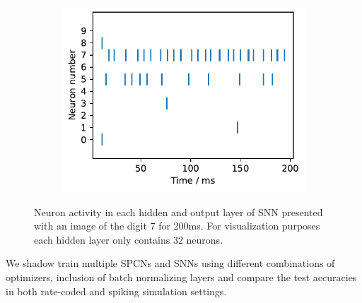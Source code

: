 \documentclass[a4paper,11pt]{article}
\begin{document}
\begin{figure}[ht]
\begin{subfigure}[t]{0.32\columnwidth}
    \includegraphics[width=\linewidth]{graphics/spikes_2.pdf}  
  \end{subfigure}
  \caption{Neuron activity in each hidden and output layer of SNN presented with an image of the digit 7 for 200ms. For visualization purposes each hidden layer only contains 32 neurons.}
\end{figure}
We shadow train multiple SPCNs and SNNs using different combinations of optimizers, inclusion of batch normalizing layers and compare the test accuracies in both rate-coded and spiking simulation settings.
\end{document}
